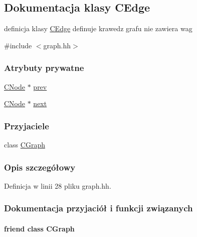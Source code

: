 \hypertarget{class_c_edge}{}\subsection{Dokumentacja klasy C\+Edge}
\label{class_c_edge}


definicja klasy \hyperlink{class_c_edge}{C\+Edge} definuje krawedz grafu nie zawiera wag  




{\ttfamily \#include $<$graph.\+hh$>$}

\subsubsection*{Atrybuty prywatne}
\begin{DoxyCompactItemize}
\item 
\hyperlink{class_c_node}{C\+Node} $\ast$ \hyperlink{class_c_edge_a6028b71c45755a0f37cd6e240b357bac}{prev}
\item 
\hyperlink{class_c_node}{C\+Node} $\ast$ \hyperlink{class_c_edge_ad1ee614fba28429ff44c5c793676cbd4}{next}
\end{DoxyCompactItemize}
\subsubsection*{Przyjaciele}
\begin{DoxyCompactItemize}
\item 
class \hyperlink{class_c_edge_a5ba04087b017dfeadb708ba91d6daf1b}{C\+Graph}
\end{DoxyCompactItemize}


\subsubsection{Opis szczegółowy}


Definicja w linii 28 pliku graph.\+hh.



\subsubsection{Dokumentacja przyjaciół i funkcji związanych}
\hypertarget{class_c_edge_a5ba04087b017dfeadb708ba91d6daf1b}{}
\paragraph[{C\+Graph}]{\setlength{\rightskip}{0pt plus 5cm}friend class {\bf C\+Graph}\hspace{0.3cm}{\ttfamily [friend]}}\label{class_c_edge_a5ba04087b017dfeadb708ba91d6daf1b}


